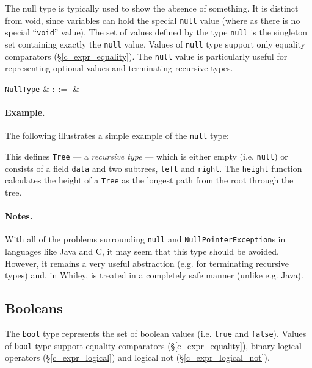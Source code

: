 The null type is typically used to show the absence of something. It is distinct from void, since variables can hold the special \lstinline{null} value (where as there is no special ``\lstinline{void}'' value).  The set of values defined by the type \lstinline{null} is the singleton set containing exactly the \lstinline{null} value.  Values of \lstinline{null} type support only equality comparators (\S\ref{c_expr_equality}).  The \lstinline{null} value is particularly useful for representing optional values and terminating recursive types.

\begin{syntax}
  \verb+NullType+ & $::=$ &  \\
\end{syntax}

\paragraph{Example.} The following illustrates a simple example of the \lstinline{null} type:



This defines \lstinline{Tree} --- a {\em recursive type} --- which is either empty (i.e. \lstinline{null}) or consists of a field \lstinline{data} and two subtrees, \lstinline{left} and \lstinline{right}.  The \lstinline{height} function calculates the height of a \lstinline{Tree} as the longest path from the root through the tree.

\paragraph{Notes.}  With all of the problems surrounding \lstinline{null} and \lstinline{NullPointerException}s in languages like Java and C, it may seem that this type should be avoided. However, it remains a very useful abstraction (e.g. for terminating recursive types) and, in Whiley, is treated in a completely safe manner (unlike e.g. Java).


\subsection{Booleans}
\label{c_types_bool}

The \lstinline{bool} type represents the set of boolean values (i.e. \lstinline{true} and \lstinline{false}).  Values of \lstinline{bool} type support equality comparators (\S\ref{c_expr_equality}), binary logical operators (\S\ref{c_expr_logical}) and logical not (\S\ref{c_expr_logical_not}).

